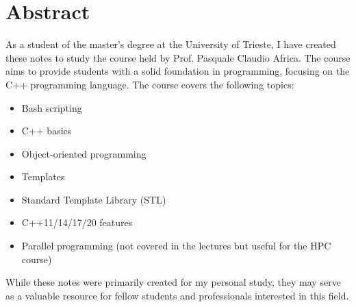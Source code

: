 
\chapter*{Abstract}

As a student of the  master's degree at the University of Trieste, I have created these notes to study the course  held by Prof. Pasquale Claudio Africa. The course aims to provide students with a solid foundation in programming, focusing on the C++ programming language. The course covers the following topics:
\begin{itemize}
    \item Bash scripting
    \item C++ basics
    \item Object-oriented programming
    \item Templates
    \item Standard Template Library (STL)
    \item C++11/14/17/20 features
    \item Parallel programming (not covered in the lectures but useful for the HPC course)
\end{itemize}
While these notes were primarily created for my personal study, they may serve as a valuable resource for fellow students and professionals interested in this field.
